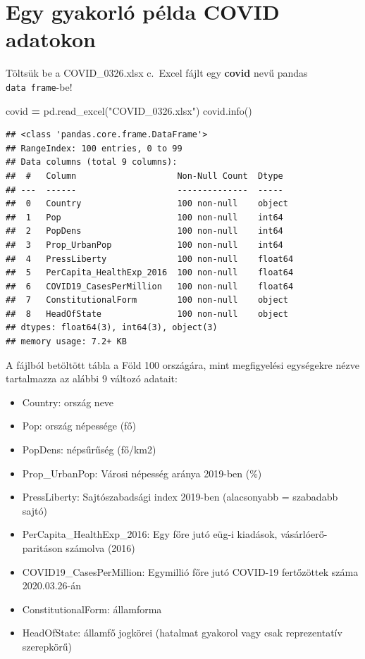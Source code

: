 \documentclass[
]{book}
\newenvironment{Shaded}{\begin{snugshade}}{\end{snugshade}}
\newcommand{\NormalTok}[1]{#1}
\newcommand{\OperatorTok}[1]{\textcolor[rgb]{0.81,0.36,0.00}{\textbf{#1}}}
\newcommand{\StringTok}[1]{\textcolor[rgb]{0.31,0.60,0.02}{#1}}
\providecommand{\tightlist}{%
  \setlength{\itemsep}{0pt}\setlength{\parskip}{0pt}}
\begin{document}
\section{Egy gyakorló példa COVID adatokon}\label{egy-gyakorluxf3-puxe9lda-covid-adatokon}

Töltsük be a COVID\_0326.xlsx c.~Excel fájlt egy \textbf{covid} nevű pandas \texttt{data\ frame}-be!

\begin{Shaded}
\begin{Highlighting}[]
\NormalTok{covid }\OperatorTok{=}\NormalTok{ pd.read\_excel(}\StringTok{"COVID\_0326.xlsx"}\NormalTok{)}
\NormalTok{covid.info()}
\end{Highlighting}
\end{Shaded}

\begin{verbatim}
## <class 'pandas.core.frame.DataFrame'>
## RangeIndex: 100 entries, 0 to 99
## Data columns (total 9 columns):
##  #   Column                    Non-Null Count  Dtype  
## ---  ------                    --------------  -----  
##  0   Country                   100 non-null    object 
##  1   Pop                       100 non-null    int64  
##  2   PopDens                   100 non-null    int64  
##  3   Prop_UrbanPop             100 non-null    int64  
##  4   PressLiberty              100 non-null    float64
##  5   PerCapita_HealthExp_2016  100 non-null    float64
##  6   COVID19_CasesPerMillion   100 non-null    float64
##  7   ConstitutionalForm        100 non-null    object 
##  8   HeadOfState               100 non-null    object 
## dtypes: float64(3), int64(3), object(3)
## memory usage: 7.2+ KB
\end{verbatim}

A fájlból betöltött tábla a Föld 100 országára, mint megfigyelési egységekre nézve tartalmazza az alábbi 9 változó adatait:

\begin{itemize}
\tightlist
\item
  Country: ország neve
\item
  Pop: ország népessége (fő)
\item
  PopDens: népsűrűség (fő/km2)
\item
  Prop\_UrbanPop: Városi népesség aránya 2019-ben (\%)
\item
  PressLiberty: Sajtószabadsági index 2019-ben (alacsonyabb = szabadabb sajtó)
\item
  PerCapita\_HealthExp\_2016: Egy főre jutó eüg-i kiadások, vásárlóerő-paritáson számolva (2016)
\item
  COVID19\_CasesPerMillion: Egymillió főre jutó COVID-19 fertőzöttek száma 2020.03.26-án
\item
  ConstitutionalForm: államforma
\item
  HeadOfState: államfő jogkörei (hatalmat gyakorol vagy csak reprezentatív szerepkörű)
\end{itemize}
\end{document}
